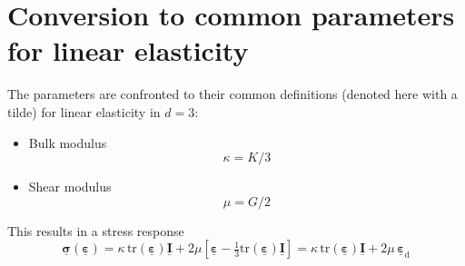 \documentclass[fleqn]{goose-article}
\newcommand\T[1]{\underline{\bm{{#1}}}}
\begin{document}
\section{Conversion to common parameters for linear elasticity}

The parameters are confronted to their common definitions
(denoted here with a tilde) for linear elasticity in $d = 3$:

\begin{itemize}

    \item Bulk modulus
    \begin{equation}
        \kappa = K / 3
    \end{equation}

    \item Shear modulus
    \begin{equation}
        \mu = G / 2
    \end{equation}

\end{itemize}
This results in a stress response
\begin{equation}
    \T{\sigma} ( \T{\varepsilon} )
    =
    \kappa \, \mathrm{tr} ( \T{\varepsilon} ) \T{I}
    +
    2 \mu \left[ \T{\varepsilon} - \tfrac{1}{3} \mathrm{tr} ( \T{\varepsilon} ) \T{I} \right]
    =
    \kappa \, \mathrm{tr} ( \T{\varepsilon} ) \T{I}
    +
    2 \mu \, \T{\varepsilon}_\mathrm{d}
\end{equation}



\end{document}
